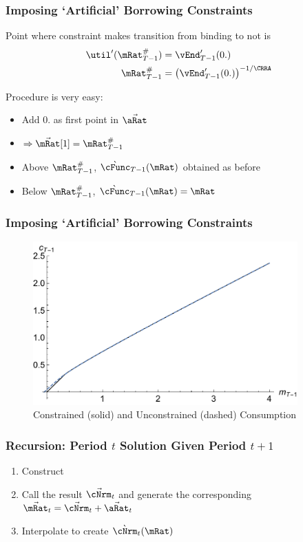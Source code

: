 \documentclass{beamer}
\begin{document}
\begin{frame}
\frametitle{Imposing `Artificial' Borrowing Constraints}

Point where constraint makes transition from binding to not is
\begin{equation*}\begin{gathered}\begin{aligned}
    \util^{\prime}(\mRat_{T-1}^{\#})  & = \vEnd^{\prime}_{T-1}(0.)
\\  \mRat_{T-1}^{\#}  & = \left(\vEnd^{\prime}_{T-1}(0.)\right)^{-1/\CRRA}
\end{aligned}\end{gathered}\end{equation*}
\pause\medskip

Procedure is very easy:
\begin{itemize}
\item Add $0.$ as first point in $\vec{\aRat}$
\item $\Rightarrow \vec{\mRat}[1] = \mRat_{T-1}^{\#}$
\item Above $\mRat_{T-1}^{\#}$, $\grave{\cFunc}_{T-1}(\mRat)$ obtained as before
\item Below $\mRat_{T-1}^{\#}$, $\grave{\cFunc}_{T-1}(\mRat)=\mRat$
\end{itemize}

\end{frame}

\begin{frame}
\frametitle{Imposing `Artificial' Borrowing Constraints}
\begin{figure}
\includegraphics[width=4in]{./Figures/cVScCon.pdf}
        \caption{Constrained (solid) and Unconstrained (dashed) Consumption}
        \label{fig:cVScCon}
\end{figure}

\end{frame}

\begin{frame}%
\frametitle{Recursion: Period $t$ Solution Given Period $t+1$}
\begin{enumerate}
\item Construct 

\item Call the result $\vec{\cNrm}_{t}$ and generate the corresponding $\vec{\mRat}_{t}=\vec{\cNrm}_{t}+\vec{\aRat}_{t}$
\item Interpolate to create $\grave{\cNrm}_{t}(\mRat)$
\end{enumerate}

\end{frame}
\end{document}

